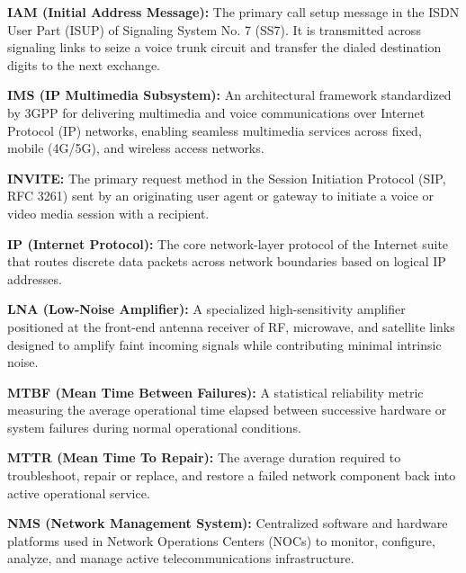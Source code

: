 \documentclass[12pt,a4paper]{report}
\begin{document}
\vspace{0.2cm}
\noindent\textbf{IAM (Initial Address Message):} The primary call setup message in the ISDN User Part (ISUP) of Signaling System No. 7 (SS7). It is transmitted across signaling links to seize a voice trunk circuit and transfer the dialed destination digits to the next exchange.

\vspace{0.2cm}
\noindent\textbf{IMS (IP Multimedia Subsystem):} An architectural framework standardized by 3GPP for delivering multimedia and voice communications over Internet Protocol (IP) networks, enabling seamless multimedia services across fixed, mobile (4G/5G), and wireless access networks.

\vspace{0.2cm}
\noindent\textbf{INVITE:} The primary request method in the Session Initiation Protocol (SIP, RFC 3261) sent by an originating user agent or gateway to initiate a voice or video media session with a recipient.

\vspace{0.2cm}
\noindent\textbf{IP (Internet Protocol):} The core network-layer protocol of the Internet suite that routes discrete data packets across network boundaries based on logical IP addresses.

\vspace{0.2cm}
\noindent\textbf{LNA (Low-Noise Amplifier):} A specialized high-sensitivity amplifier positioned at the front-end antenna receiver of RF, microwave, and satellite links designed to amplify faint incoming signals while contributing minimal intrinsic noise.

\vspace{0.2cm}
\noindent\textbf{MTBF (Mean Time Between Failures):} A statistical reliability metric measuring the average operational time elapsed between successive hardware or system failures during normal operational conditions.

\vspace{0.2cm}
\noindent\textbf{MTTR (Mean Time To Repair):} The average duration required to troubleshoot, repair or replace, and restore a failed network component back into active operational service.

\vspace{0.2cm}
\noindent\textbf{NMS (Network Management System):} Centralized software and hardware platforms used in Network Operations Centers (NOCs) to monitor, configure, analyze, and manage active telecommunications infrastructure.
\end{document}
